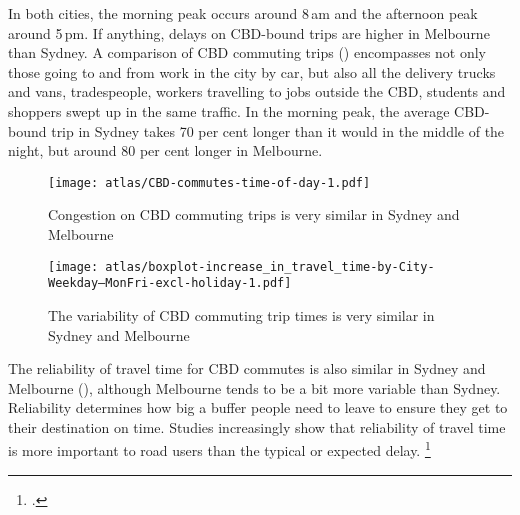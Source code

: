 \documentclass{grattan}
\begin{document}
In both cities, the morning peak occurs around 8\,am and the afternoon peak around 5\,pm.
If anything, delays on CBD-bound trips are higher in Melbourne than Sydney.
A comparison of CBD commuting trips () encompasses not only those going to and from work in the city by car, but also all the delivery trucks and vans, tradespeople, workers travelling to jobs outside the CBD, students and shoppers swept up in the same traffic.
In the morning peak, the average CBD-bound trip in Sydney takes 70 per cent longer than it would in the middle of the night, but around 80 per cent longer in Melbourne.

\begin{figure}
\caption{Congestion on CBD commuting trips is very similar in Sydney and Melbourne}\label{fig:aggregate-delay-CBD-commutes}
\texttt{[image: atlas/CBD-commutes-time-of-day-1.pdf]}
%
\end{figure}
\begin{figure}
\caption{The variability of CBD commuting trip times is very similar in Sydney and Melbourne}\label{fig:aggregate-variability-CBD-commutes}
\texttt{[image: atlas/boxplot-increase\_in\_travel\_time-by-City-Weekday--MonFri-excl-holiday-1.pdf]}
\end{figure}

The reliability of travel time for CBD commutes is also similar in Sydney and Melbourne (), although Melbourne tends to be a bit more variable than Sydney. Reliability determines how big a buffer people need to leave to ensure they get to their destination on time. Studies increasingly show that reliability of travel time is more important to road users than the typical or expected delay.%
    \footcites{2005-Small-estimates-for-travel-time-and-reliability}{2017-Brent-and-Gross-value-of-travel-time-and-reliability}{Cortright-2017-CityObs-What-hot-lanes-reveal-about-the-value-of-travel-time}
\end{document}
